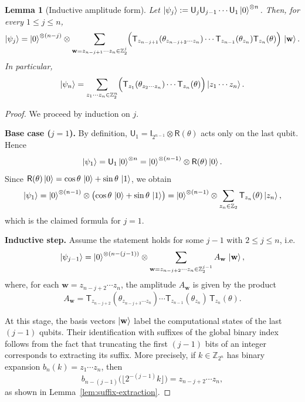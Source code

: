 \documentclass[10pt,a4paper]{amsart}
\newtheorem{lemma}{Lemma}
\newcommand{\rI}{\mathsf{I}}
\newcommand{\rR}{\mathsf{R}}
\newcommand{\rU}{\mathsf{U}}
\begin{document}
\begin{lemma}[Inductive amplitude form]\label{lem:inductive_state}
Let $\ket{\psi_j}:=\rU_j\rU_{j-1}\cdots \rU_1\ket{0}^{\otimes n}$.
Then, for every $1\le j\le n$,
\[
\ket{\psi_j}
=
\ket{0}^{\otimes (n-j)}\otimes
\sum_{\mathbf{w}=z_{n-j+1}\cdots z_n\in\mathbb{Z}_2^{j}}
\Bigl(\mathsf{T}_{z_{n-j+1}}(\theta_{z_{n-j+2}\cdots z_n})\cdots
\mathsf{T}_{z_{n-1}}(\theta_{z_n})\mathsf{T}_{z_n}(\theta)\Bigr)\,
\ket{\mathbf{w}}.
\]
In particular,
\[
\ket{\psi_n}
=
\sum_{z_1\cdots z_n\in\mathbb{Z}_2^n}
\Bigl(\mathsf{T}_{z_1}(\theta_{z_2\cdots z_n})\cdots \mathsf{T}_{z_n}(\theta)\Bigr)\ket{z_1\cdots z_n}.
\]
\end{lemma}

\begin{proof}
We proceed by induction on $j$.

\smallskip
\noindent\textbf{Base case ($j=1$).}
By definition, $\rU_1=\rI_{2^{n-1}}\otimes \rR(\theta)$ acts only on the last qubit. Hence
\[
\ket{\psi_1}
=\rU_1\ket{0}^{\otimes n}
=\ket{0}^{\otimes(n-1)}\otimes \rR(\theta)\ket{0}.
\]
Since $\rR(\theta)\ket{0}=\cos\theta\,\ket{0}+\sin\theta\,\ket{1}$, we obtain
\[
\ket{\psi_1}
=\ket{0}^{\otimes(n-1)}\otimes\bigl(\cos\theta\,\ket{0}+\sin\theta\,\ket{1}\bigr)
=\ket{0}^{\otimes(n-1)}\otimes\sum_{z_n\in\mathbb{Z}_2}\mathsf{T}_{z_n}(\theta)\ket{z_n},
\]
which is the claimed formula for $j=1$.

\smallskip
\noindent\textbf{Inductive step.}
Assume the statement holds for some $j-1$ with $2\le j\le n$, i.e.
\begin{equation}\label{eq:psi_jminus1}
\ket{\psi_{j-1}}
=
\ket{0}^{\otimes (n-(j-1))}\otimes
\sum_{\mathbf{w}=z_{n-j+2}\cdots z_n\in\mathbb{Z}_2^{j-1}}
A_{\mathbf{w}}\,\ket{\mathbf{w}},
\end{equation}
where, for each $\mathbf{w}=z_{n-j+2}\cdots z_n$, the amplitude $A_{\mathbf{w}}$ is given by the product
\begin{equation}\label{eq:Aw_def}
A_{\mathbf{w}}
=
\mathsf{T}_{z_{n-j+2}}(\theta_{z_{n-j+3}\cdots z_n})\cdots
\mathsf{T}_{z_{n-1}}(\theta_{z_n})\,
\mathsf{T}_{z_n}(\theta).
\end{equation}

At this stage, the basis vectors $\ket{\mathbf{w}}$ label the computational states of the last $(j-1)$ qubits.
Their identification with suffixes of the global binary index follows from the fact that truncating
the first $(j-1)$ bits of an integer corresponds to extracting its suffix.
More precisely, if $k\in\mathbb{Z}_{2^n}$ has binary expansion $b_n(k)=z_1\cdots z_n$, then
\[
b_{n-(j-1)}\!\bigl(\lfloor 2^{-(j-1)}k\rfloor\bigr)=z_{n-j+2}\cdots z_n,
\]
as shown in Lemma~\ref{lem:suffix-extraction}.




\end{proof}
\end{document}
